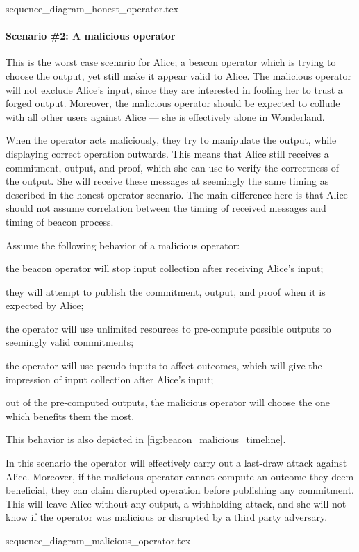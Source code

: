 {sequence_diagram_honest_operator.tex}

\paragraph{Scenario \#2: A malicious operator}
This is the worst case scenario for Alice; a beacon operator which is trying to choose the output, yet still make it appear valid to Alice.
The malicious operator will not exclude Alice's input, since they are interested in fooling her to trust a forged output.
Moreover, the malicious operator should be expected to collude with all other users against Alice --- she is effectively alone in Wonderland.

When the operator acts maliciously, they try to manipulate the output, while displaying correct operation outwards.
This means that Alice still receives a commitment, output, and proof, which she can use to verify the correctness of the output.
She will receive these messages at seemingly the same timing as described in the honest operator scenario.
The main difference here is that Alice should not assume correlation between the timing of received messages and timing of beacon process.

Assume the following behavior of a malicious operator:
\begin{eletterate*}
\item the beacon operator will stop input collection after receiving Alice's input;
\item they will attempt to publish the commitment, output, and proof when it is expected by Alice;
\item the operator will use unlimited resources to pre-compute possible outputs to seemingly valid commitments;
\item the operator will use pseudo inputs to affect outcomes, which will give the impression of input collection after Alice's input;
\item out of the pre-computed outputs, the malicious operator will choose the one which benefits them the most.
\end{eletterate*}
This behavior is also depicted in \cref{fig:beacon_malicious_timeline}.

In this scenario the operator will effectively carry out a last-draw attack against Alice.
Moreover, if the malicious operator cannot compute an outcome they deem beneficial, they can claim disrupted operation before publishing any commitment.
This will leave Alice without any output, a withholding attack, and she will not know if the operator was malicious or disrupted by a third party adversary.

{sequence_diagram_malicious_operator.tex}
